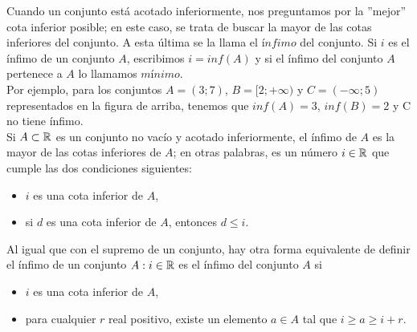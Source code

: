 \documentclass[../Teoría.root.tex]{subfiles}
\begin{document}
        \begin{center}
            \begin{scaletikzpicturetowidth}{0.5\linewidth}
            \end{scaletikzpicturetowidth}
        \end{center}
        Cuando un conjunto está acotado inferiormente, nos preguntamos por la ”mejor” cota inferior posible; en este caso, se trata de buscar la mayor de las cotas inferiores del conjunto. A esta última se la llama el \(\textit{ínfimo}\) del conjunto. Si \(i\) es el ínfimo de un conjunto \(A\), escribimos \(i = inf(A)\) y si el ínfimo del conjunto \(A\) pertenece a \(A\) lo llamamos \(\textit{mínimo}\).\\
        Por ejemplo, para los conjuntos \(A = (3; 7)\), \(B = [2; +\infty)\) y \(C = (−\infty; 5)\) representados en la figura de arriba, tenemos que \(inf(A) = 3\), \(inf(B) = 2\) y C no tiene ínfimo.\\
        Si \(A \subset \mathbb{R}\) es un conjunto no vacío y acotado inferiormente, el ínfimo de \(A\) es la mayor de las cotas inferiores de \(A\); en otras palabras, es un número \(i \in \mathbb{R}\) que cumple las dos condiciones siguientes:
        \begin{itemize}
            \item \(i\) es una cota inferior de \(A\),
            \item si \(d\) es una cota inferior de \(A\), entonces \(d \leq i\).
        \end{itemize}
        Al igual que con el supremo de un conjunto, hay otra forma equivalente de definir el ínfimo de un conjunto \(A: i \in \mathbb{R}\) es el ínfimo del conjunto \(A\) si
        \begin{itemize}
            \item \(i\) es una cota inferior de \(A\),
            \item para cualquier \(r\) real positivo, existe un elemento \(a \in A\) tal que \(i \geq a \geq i + r\).
        \end{itemize}
\end{document}

